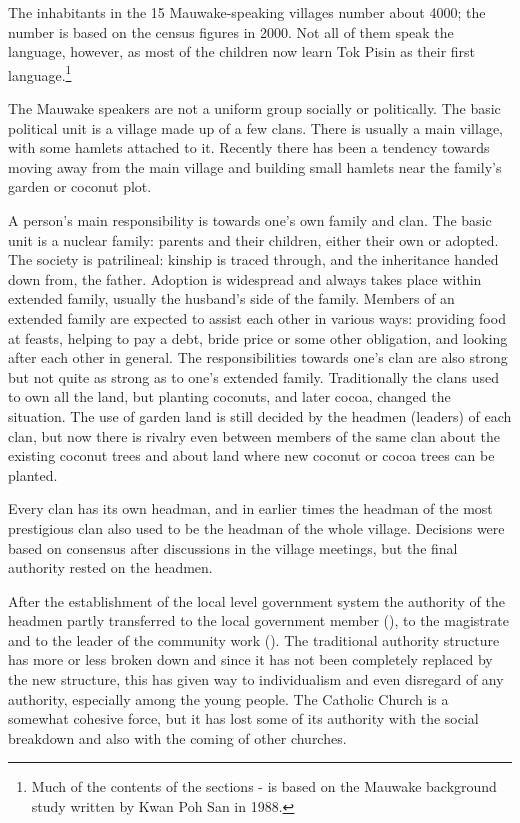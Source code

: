 

The inhabitants in the 15 Mauwake-speaking villages number about 4000;  the number is based on the census figures in 2000.  Not all of them speak the language, however, as most of the children now learn Tok Pisin as their first language.\footnote{Much of the contents of the sections - is based on the Mauwake background study written by Kwan Poh San in 1988.} 


The Mauwake speakers are not a uniform group socially or politically. The basic political unit is a village made up of a few clans. There is usually a main village, with some hamlets attached to it.  Recently there has been a tendency towards moving away from the main village and building small hamlets near the family's garden or coconut plot. 

A person's main responsibility is towards one's own family and clan. The basic unit is a nuclear family: parents and their children, either their own or adopted.  The society is patrilineal: kinship is traced through, and the inheritance handed down from, the father. Adoption is widespread and always takes place within extended family, usually the husband's side of the family.  Members of an extended family are expected to assist each other in various ways: providing food at feasts, helping to pay a debt, bride price or some other obligation, and looking after each other in general. The responsibilities towards one's clan are also strong but not quite as strong as to one's extended family.  Traditionally the clans used to own all the land, but planting coconuts, and later cocoa, changed the situation.  The use of garden land is still decided by the headmen (leaders) of each clan, but now there is rivalry even between members of the same clan about the existing coconut trees and about land where new coconut or cocoa trees can be planted.

Every clan has its own headman, and in earlier times the headman of the most prestigious clan also used to be the headman of the whole village. Decisions were based on consensus after discussions in the village meetings, but the final authority rested on the headmen.

After the establishment of the local level government system the authority of the headmen partly transferred to the local government member (), to the magistrate and to the leader of the community work (). The traditional authority structure has more or less broken down and since it has not been completely replaced by the new structure, this has given way to individualism and even disregard of any authority, especially among the young people. The Catholic Church is a somewhat cohesive force, but it has lost some of its authority with the social breakdown and also with the coming of other churches.

